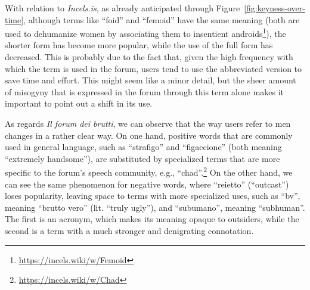 \documentclass[11pt]{article}
\newcommand{\enforum}{\textit{Incels.is}}
\newcommand{\itforum}{\textit{Il forum dei brutti}}
\begin{document}
With relation to \enforum, as already anticipated through Figure~\ref{fig:keyness-over-time}, although terms like ``foid'' and ``femoid'' have the same meaning (both are used to dehumanize women by associating them to insentient androids\footnote{\url{https://incels.wiki/w/Femoid}}), the shorter form has become more popular, while the use of the full form has decreased. This is probably due to the fact that, given the high frequency with which the term is used in the forum, users tend to use the abbreviated version to save time and effort. This might seem like a minor detail, but the sheer amount of misogyny that is expressed in the forum through this term alone makes it important to point out a shift in its use.

As regards \itforum, we can observe that the way users refer to men changes in a rather clear way. On one hand, positive words that are commonly used in general language, such as ``strafigo'' and ``figaccione'' (both meaning ``extremely handsome''), are substituted by specialized terms that are more specific to the forum's speech community, e.g., ``chad''.\footnote{\url{https://incels.wiki/w/Chad}} On the other hand, we can see the same phenomenon for negative words, where ``reietto'' (``outcast'') loses popularity, leaving space to terms with more specialized uses, such as ``bv'', meaning ``brutto vero'' (lit. ``truly ugly''), and ``subumano'', meaning ``subhuman''. The first is an acronym, which makes its meaning opaque to outsiders, while the second is a term with a much stronger and denigrating connotation.

\end{document}
